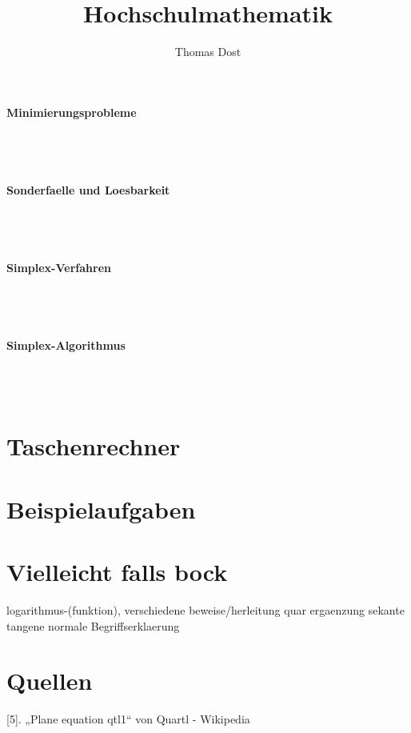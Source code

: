 \documentclass[a4paper]{article} %
\begin{document}
	\paragraph{Minimierungsprobleme}
	 \hspace{0 cm} \\ \noindent \\
	\paragraph{Sonderfaelle und Loesbarkeit}
	 \hspace{0 cm} \\ \noindent \\
	\paragraph{Simplex-Verfahren}
	 \hspace{0 cm} \\ \noindent \\
	\paragraph{Simplex-Algorithmus}
	 \hspace{0 cm} \\ \noindent \\
	\section{Taschenrechner}
	\section{Beispielaufgaben}
	\section{Vielleicht falls bock}
	logarithmus-(funktion), verschiedene beweise/herleitung
	quar ergaenzung sekante tangene normale
	Begriffserklaerung

	\section{Quellen}
	[5]. „Plane equation qtl1“ von Quartl - Wikipedia

	\begin{titlepage}
	\title{Hochschulmathematik}
	\author{Thomas Dost}
	\date{} %
	\maketitle
	\newpage
	\tableofcontents
	\newpage
	\end{titlepage}
\end{document}
